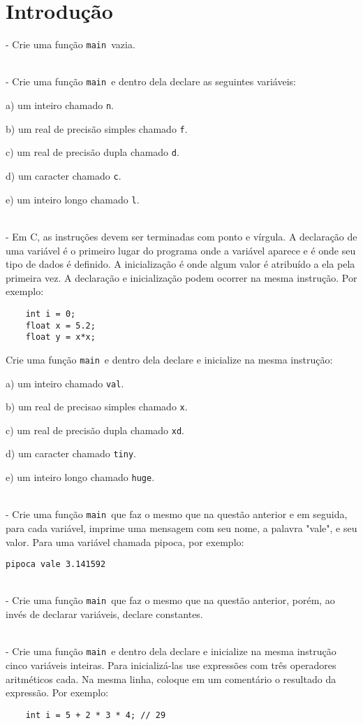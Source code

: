 \documentclass{book}
\newcommand{\NEWLINE}{~\\}
\newcommand{\MAIN}{{\tt main}}
\begin{document}
\zeraquest

\section{Introdução}

\quest - Crie uma função \MAIN\ vazia.

\NEWLINE
\quest - Crie uma função \MAIN\ e dentro dela declare as seguintes variáveis:

	a) um inteiro chamado {\tt n}.

	b) um real de precisão simples chamado {\tt f}.

	c) um real de precisão dupla chamado {\tt d}.

	d) um caracter chamado {\tt c}.

	e) um inteiro longo chamado {\tt l}.

\NEWLINE
\quest - Em C, as instruções devem ser terminadas com ponto e vírgula. A declaração de uma variável é o primeiro lugar do programa onde a variável aparece e é onde seu tipo de dados é definido. A inicialização é onde algum valor é atribuído a ela pela primeira vez. A declaração e inicialização podem ocorrer na mesma instrução. Por exemplo:
\begin{lstlisting}
	int i = 0;
	float x = 5.2;
	float y = x*x;
\end{lstlisting}
Crie uma função \MAIN\ e dentro dela declare e inicialize na mesma instrução:

	a) um inteiro chamado {\tt val}.

	b) um real de precisao simples chamado {\tt x}.

	c) um real de precisão dupla chamado {\tt xd}.

	d) um caracter chamado {\tt tiny}.

	e) um inteiro longo chamado {\tt huge}.

\NEWLINE
\quest - Crie uma função \MAIN\ que faz o mesmo que na questão anterior e em seguida, para cada variável, imprime uma mensagem com seu nome, a palavra "vale", e seu valor. Para uma variável chamada pipoca, por exemplo:

	{\tt pipoca vale 3.141592}

\NEWLINE
\quest - Crie uma função \MAIN\ que faz o mesmo que na questão anterior, porém, ao invés de declarar variáveis, declare constantes.

\NEWLINE
\quest - Crie uma função \MAIN\ e dentro dela declare e inicialize na mesma instrução cinco variáveis inteiras. Para inicializá-las use expressões com três operadores aritméticos cada. Na mesma linha, coloque em um comentário o resultado da expressão. Por exemplo:
\begin{lstlisting}
	int i = 5 + 2 * 3 * 4; // 29
\end{lstlisting}
\end{document}

